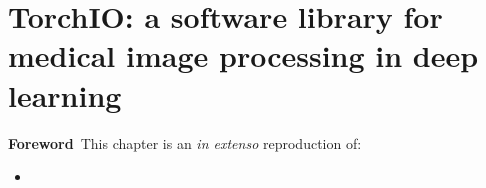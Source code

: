 \chapter[TorchIO: a software library for medical image processing]{TorchIO: a software library for medical image processing in deep learning}

\label{chap:torchio}
\minitoc

\begin{center}
  \begin{minipage}[b]{0.9\linewidth}
    \small
    \textbf{Foreword\,}
    This chapter is an \textit{in extenso} reproduction of:
    \begin{itemize}
      \item {}
    \end{itemize}
  \end{minipage}
\end{center}
